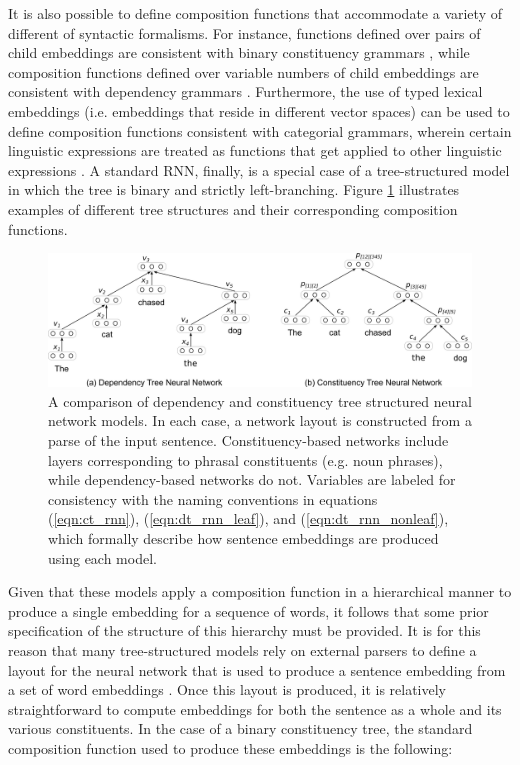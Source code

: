 It is also possible to define composition functions that accommodate a variety of different of syntactic formalisms. For instance, functions defined over pairs of child embeddings are consistent with binary constituency grammars \citep{Socher:2012}, while composition functions defined over variable numbers of child embeddings are consistent with dependency grammars \citep{Socher:2014,Tai:2015}. Furthermore, the use of typed lexical embeddings (i.e. embeddings that reside in different vector spaces) can be used to define composition functions consistent with categorial grammars, wherein certain linguistic expressions are treated as functions that get applied to other linguistic expressions \citep{Baroni:2014}. A standard RNN, finally, is a special case of a tree-structured model in which the tree is binary and strictly left-branching. Figure \ref{fig:tree-rnn} illustrates examples of different tree structures and their corresponding composition functions. 

\begin{figure}
\centering
	\includegraphics[width=6in]{figures/tree_comp.png}
	\caption{A comparison of dependency and constituency tree structured neural network models. In each case, a network layout is constructed from a parse of the input sentence. Constituency-based networks include layers corresponding to phrasal constituents (e.g. noun phrases), while dependency-based networks do not. Variables are labeled for consistency with the naming conventions in equations (\ref{eqn:ct_rnn}), (\ref{eqn:dt_rnn_leaf}), and (\ref{eqn:dt_rnn_nonleaf}), which formally describe how sentence embeddings are produced using each model.}
\label{fig:tree-rnn}
\end{figure}

Given that these models apply a composition function in a hierarchical manner to produce a single embedding for a sequence of words, it follows that some prior specification of the structure of this hierarchy must be provided. It is for this reason that many tree-structured models rely on external parsers to define a layout for the neural network that is used to produce a sentence embedding from a set of word embeddings \citep{Socher:2012,Socher:2014}. Once this layout is produced, it is relatively straightforward to compute embeddings for both the sentence as a whole and its various constituents. In the case of a binary constituency tree, the standard composition function used to produce these embeddings is the following:

